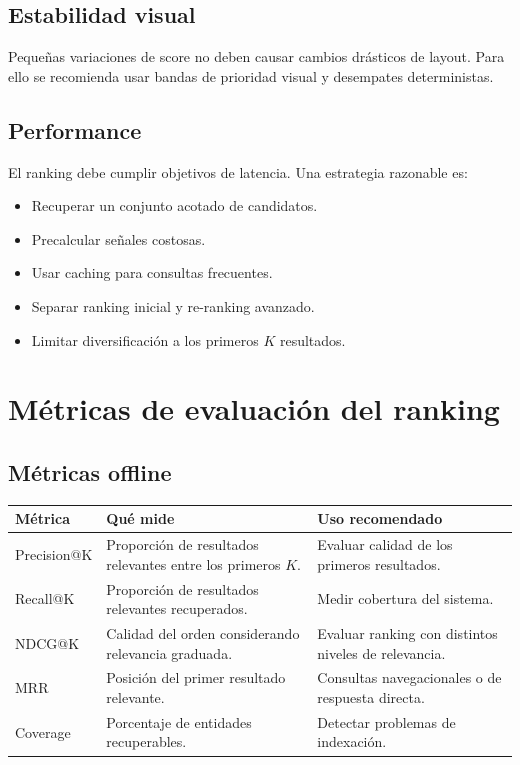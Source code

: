 \documentclass[12pt,a4paper]{article}
\begin{document}
\subsection{Estabilidad visual}

Pequeñas variaciones de score no deben causar cambios drásticos de layout. Para ello se recomienda usar bandas de prioridad visual y desempates deterministas.

\subsection{Performance}

El ranking debe cumplir objetivos de latencia. Una estrategia razonable es:

\begin{itemize}[noitemsep]
    \item Recuperar un conjunto acotado de candidatos.
    \item Precalcular señales costosas.
    \item Usar caching para consultas frecuentes.
    \item Separar ranking inicial y re-ranking avanzado.
    \item Limitar diversificación a los primeros $K$ resultados.
\end{itemize}

\section{Métricas de evaluación del ranking}

\subsection{Métricas offline}

\begin{longtable}{p{4cm}p{5cm}p{5cm}}
\toprule
\textbf{Métrica} & \textbf{Qué mide} & \textbf{Uso recomendado} \\
\midrule
\endhead

Precision@K & Proporción de resultados relevantes entre los primeros $K$. & Evaluar calidad de los primeros resultados. \\

Recall@K & Proporción de resultados relevantes recuperados. & Medir cobertura del sistema. \\

NDCG@K & Calidad del orden considerando relevancia graduada. & Evaluar ranking con distintos niveles de relevancia. \\

MRR & Posición del primer resultado relevante. & Consultas navegacionales o de respuesta directa. \\

Coverage & Porcentaje de entidades recuperables. & Detectar problemas de indexación. \\

\bottomrule
\end{longtable}
\end{document}
